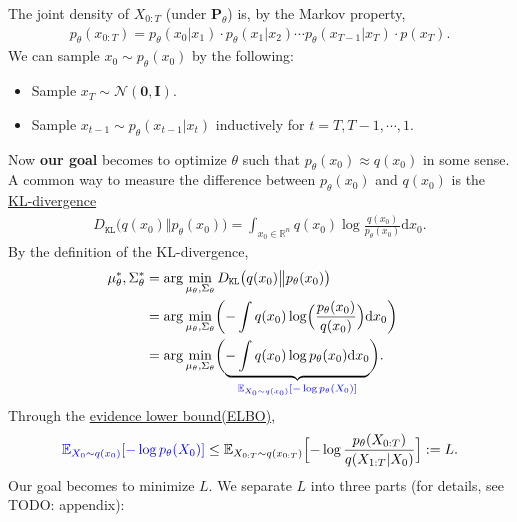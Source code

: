 \documentclass[
]{article}
\providecommand{\tightlist}{%
  \setlength{\itemsep}{0pt}\setlength{\parskip}{0pt}}\usepackage{longtable,booktabs,array}
\theoremstyle{remark}
\begin{document}
The joint density of \(X_{0:T}\) (under \(\mathbf{P}_{\theta}\)) is, by
the Markov property, \[
\begin{aligned}
  p_{\theta}(x_{0:T}) = p_{\theta}(x_0 \vert x_1) \cdot p_{\theta}(x_1\vert x_2) \cdots p_{\theta}(x_{T-1}\vert x_T) \cdot p(x_T).
\end{aligned}
\] We can sample \(x_0\sim p_{\theta}(x_0)\) by the following:

\begin{itemize}
\tightlist
\item
  Sample \(x_T\sim \mathcal{N}(\mathbf{0},\mathbf{I}).\)
\item
  Sample \(x_{t-1}\sim p_{\theta}(x_{t-1}\vert x_t)\) inductively for
  \(t=T,T-1,\cdots,1.\)
\end{itemize}

Now \textbf{our goal} becomes to optimize \(\theta\) such that
\(p_{\theta}(x_0)\approx q(x_0)\) in some sense. A common way to measure
the difference between \(p_{\theta}(x_0)\) and \(q(x_0)\) is the
\href{https://en.wikipedia.org/wiki/Kullback–Leibler_divergence}{KL-divergence}
\[
\begin{aligned}
  D_{\mathtt{KL}} \bigl( q(x_0) \Vert p_{\theta}(x_0) \bigr) 
  = \int_{x_0\in \mathbb R^n} q(x_0) \log \frac{q(x_0)}{p_{\theta}(x_0)} \mathrm{d}x_0.
\end{aligned}
\] By the definition of the KL-divergence, \[
\begin{aligned}
\mu_{\theta}^*, \Sigma_{\theta}^* 
&= \arg \min_{\mu_{\theta},\Sigma_{\theta}} D_{\mathtt{KL}} \bigl( q(x_0) \big\Vert p_{\theta}(x_0) \bigr) \cr 
&= \arg \min_{\mu_\theta,\Sigma_\theta} \biggl( -\int q(x_0) \log \Bigl( \frac{p_{\theta}(x_0)}{q(x_0)} \Bigr) \mathrm{d}x_0 \biggr) \cr
&= \arg \min_{\mu_{\theta},\Sigma_{\theta}} \biggl( \underbrace{-\int q(x_0) \log p_{\theta}(x_0) \mathrm{d}x_0}_{\color{blue}{\mathbb E_{X_0\sim q(x_0)}[-\log p_{\theta}(X_0)]}} \biggr).
\end{aligned}
\] Through the
\href{https://en.wikipedia.org/wiki/Evidence_lower_bound}{evidence lower
bound(ELBO)}, \[
\begin{aligned}
  {\color{blue}{\mathbb E_{X_0\sim q(x_0)}[-\log p_{\theta}(X_0)]}} \leq 
  \mathbb E_{X_{0:T}\sim q(x_{0:T})} \Bigl[ -\log \frac{p_{\theta}(X_{0:T})}{q(X_{1:T}\vert X_0)} \Bigr]:= L.
\end{aligned}
\] Our goal becomes to minimize \(L.\) We separate \(L\) into three
parts (for details, see TODO: appendix):
\end{document}
